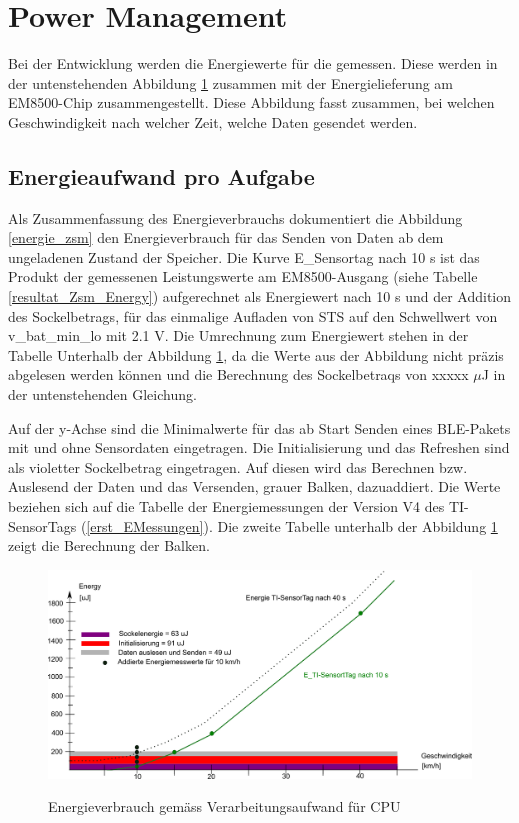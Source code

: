 \section{Power Management}

Bei der Entwicklung werden die Energiewerte für die gemessen. Diese werden in der untenstehenden Abbildung \ref{r_bild_e_zusammenfassung} zusammen mit der Energielieferung am EM8500-Chip zusammengestellt. Diese Abbildung fasst zusammen, bei welchen Geschwindigkeit nach welcher Zeit, welche Daten gesendet werden. 

\subsection{Energieaufwand pro Aufgabe}

Als Zusammenfassung des Energieverbrauchs dokumentiert die Abbildung \ref{energie_zsm} den Energieverbrauch für das Senden von Daten ab dem ungeladenen Zustand der Speicher. Die Kurve E\_Sensortag nach 10 s ist das Produkt der gemessenen Leistungswerte am EM8500-Ausgang (siehe Tabelle \ref{resultat_Zsm_Energy}) aufgerechnet als Energiewert nach 10 s und der Addition des Sockelbetrags, für das einmalige Aufladen von STS auf den Schwellwert von v\_bat\_min\_lo mit 2.1 V. Die Umrechnung zum Energiewert stehen in der Tabelle Unterhalb der Abbildung \ref{r_bild_e_zusammenfassung}, da die Werte aus der Abbildung nicht präzis abgelesen werden können und die Berechnung des Sockelbetraqs von xxxxx $\mu$J in der untenstehenden Gleichung.

Auf der y-Achse sind die Minimalwerte für das ab Start Senden eines BLE-Pakets mit und ohne Sensordaten eingetragen. Die Initialisierung und das Refreshen sind als violetter Sockelbetrag eingetragen. Auf diesen wird das Berechnen bzw. Auslesend der Daten und das Versenden, grauer Balken, dazuaddiert. Die Werte beziehen sich auf die Tabelle der Energiemessungen der Version V4 des TI-SensorTags (\ref{erst_EMessungen}). Die zweite Tabelle unterhalb der Abbildung \ref{r_bild_e_zusammenfassung} zeigt die Berechnung der Balken.



\begin{figure}[ht]
     \includegraphics[width=1\textwidth]{4Resultate/imag/EnergyVerbrauchZusammenfassung.png}\label{resultat_Zsm_Energy} 
     \caption{Energieverbrauch gem\"{a}ss Verarbeitungsaufwand für CPU}
     \label{r_bild_e_zusammenfassung}
\end{figure}


